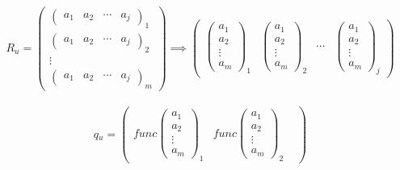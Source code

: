 \begin{center}
    \[  \textit{R$_{u}$}=
        \begin{pmatrix}
            \begin{pmatrix} a_{1}  &  a_{2}  &  \cdots   & a_{j} \end{pmatrix}_{1} \\ 
            \begin{pmatrix} a_{1}  &  a_{2}  &  \cdots   & a_{j} \end{pmatrix}_{2} \\ 
            \vdots \\ 
            \begin{pmatrix} a_{1}  &  a_{2}  &  \cdots   & a_{j} \end{pmatrix}_{m}
        \end{pmatrix}
        \implies
        \begin{pmatrix}
            \begin{pmatrix} a_{1}  \\  a_{2}  \\  \vdots   \\ a_{m} \end{pmatrix}_{1} & 
            \begin{pmatrix} a_{1}  \\  a_{2}  \\  \vdots   \\ a_{m} \end{pmatrix}_{2} & 
            \cdots &
            \begin{pmatrix} a_{1}  \\  a_{2}  \\  \vdots   \\ a_{m} \end{pmatrix}_{j}
        \end{pmatrix}    
    \]
    \\
    \[  \textit{q$_{u}$} = 
        \begin{pmatrix}
            \textit{func}\begin{pmatrix} a_{1}  \\  a_{2}  \\  \vdots   \\ a_{m} \end{pmatrix}_{1} & 
            \textit{func}\begin{pmatrix} a_{1}  \\  a_{2}  \\  \vdots   \\ a_{m} \end{pmatrix}_{2} & 

\end{pmatrix}\]
\end{center}
